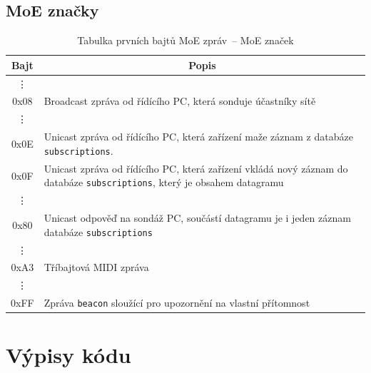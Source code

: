 \section{\acs{MoE} značky}\label{chpt:MoEZnacky}
\begin{table}[h!]
	\centering
	\caption{Tabulka prvních bajtů \acs{MoE} zpráv~-- MoE značek}
	\begin{tabular}{|  >{\ttfamily} c | p{} |}
		\hline
		\textnormal{Bajt} & \multicolumn{1}{|c|}{Popis} \\
		\hline \hline
		\vdots & \\
		
		0x08 & Broadcast zpráva od řídícího PC, která sonduje účastníky sítě \\
		
		\vdots & \\

		0x0E & Unicast zpráva od řídícího  PC, která zařízení maže záznam z databáze \texttt{subscriptions}. \\
		
		0x0F & Unicast zpráva od řídícího PC, která zařízení vkládá nový záznam do databáze \texttt{subscriptions}, který je obsahem datagramu \\
		
		\vdots & \\
		
		0x80 & Unicast odpověď na sondáž PC, součástí datagramu je i jeden záznam databáze \texttt{subscriptions} \\

		\vdots & \\

		0xA3 & Tříbajtová \acs{MIDI} zpráva \\
		
		\vdots & \\
		
		0xFF & Zpráva \texttt{beacon} sloužící pro upozornění na vlastní přítomnost \\
		\hline
	\end{tabular}
\end{table}


\chapter{Výpisy kódu}

